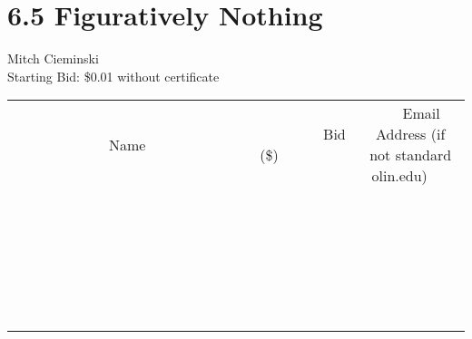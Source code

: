 \documentclass[11pt]{article}
\begin{document}
\section*{6.5 Figuratively Nothing}
Mitch Cieminski
\\
Starting Bid: \$0.01
\newline
without certificate
\\[6ex]
\begin{tabular}{c c c}
~~~~~~~~~~~~~Name~~~~~~~~~~~~~ & ~~~~~~~~~Bid (\$)~~~~~~~~~  & ~~~Email Address (if not standard olin.edu)~~~\\
 & & \\
\hline
 & & \\
\hline
 & & \\
\hline
 & & \\
\hline
 & & \\
\hline
 & & \\
\hline
 & & \\
\hline
 & & \\
\hline
 & & \\
\hline
 & & \\
\hline
 & & \\
\hline
 & & \\
\hline
 & & \\
\hline
 & & \\
\hline
 & & \\
\hline
 & & \\
\hline
 & & \\
\hline
 & & \\
\hline
 & & \\
\hline
 & & \\
\hline
 & & \\
\hline
 & & \\
\hline
 & & \\
\hline
 & & \\
\hline
 & & \\
\hline
 & & \\
\hline
\end{tabular}
\newpage
\end{document}
